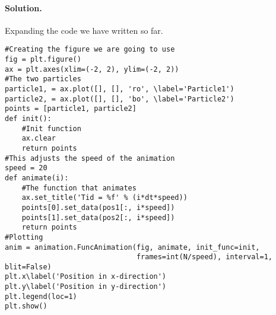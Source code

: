 \documentclass[%
oneside,                 %
final,                   %
10pt]{article}
\newenvironment{doconceexercise}{}{}
\begin{document}
\begin{doconceexercise}


\paragraph{Solution.}
Expanding the code we have written so far.
\begin{verbatim}
#Creating the figure we are going to use
fig = plt.figure()
ax = plt.axes(xlim=(-2, 2), ylim=(-2, 2))
#The two particles
particle1, = ax.plot([], [], 'ro', \label='Particle1')
particle2, = ax.plot([], [], 'bo', \label='Particle2')
points = [particle1, particle2]
def init():
    #Init function
    ax.clear
    return points
#This adjusts the speed of the animation
speed = 20
def animate(i):
    #The function that animates
    ax.set_title('Tid = %f' % (i*dt*speed))
    points[0].set_data(pos1[:, i*speed])
    points[1].set_data(pos2[:, i*speed])
    return points
#Plotting
anim = animation.FuncAnimation(fig, animate, init_func=init,
                               frames=int(N/speed), interval=1, blit=False)
plt.x\label('Position in x-direction')
plt.y\label('Position in y-direction')
plt.legend(loc=1)
plt.show()
\end{verbatim}


\end{doconceexercise}



\end{document}
